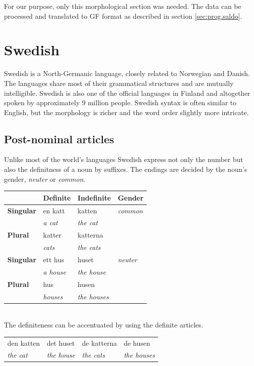 \documentclass{report}
\begin{document}
For our purpose, only this morphological section was needed.
The data can be processed and translated to GF format as described in 
section \ref{sec:prog.saldo}.

\section{Swedish}
\label{sec:swedish}
Swedish \cite[Inl. ]{SAG}is a North-Germanic language,
closely related to Norwegian and Danish. The languages share most of their
grammatical structures and are mutually intelligible. Swedish is also 
one of the official languages in Finland and altogether spoken by approximately 9
million people.
Swedish syntax is often similar to English, but the  morphology is richer and the
word order slightly more intricate.

\subsection*{Post-nominal articles} 
Unlike most of the world's languages Swedish express not only the number but also
the definitness of a noun by suffixes. The endings are decided by the noun's gender,
\textit{neuter} or \textit{common}.\\
\begin{tabular}{l|lll}
&\textbf{Definite}& \textbf{Indefinite}& \textbf{Gender} \\
 \hline
\textbf{Singular} & {en katt} & {katten} & \textit{common}\\
& \emph{a cat} & \emph{the cat} &\\
\textbf{Plural} & katter & katterna &\\
 &\emph{cats} & \emph{the cats} &\\
 \hline
\textbf{Singular} & {ett hus} & {huset} & \textit{neuter}\\
 & \emph{a house} & \emph{the house} & \\
\textbf{Plural} & hus & husen & \\
& \emph{houses} & \emph{the houses} & \\
\end{tabular}\\

The definiteness can be accentuated by using the definite articles.\\
\begin{tabular}{llll}
den katten & det huset & de katterna & de husen \\
\emph{the cat} & \emph{the house} & \emph{the cats} & \emph{the houses} \\
\end{tabular}\\
\end{document}
